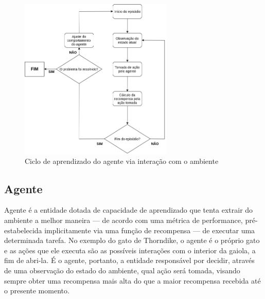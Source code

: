 \documentclass[cic,tc]{iiufrgs}
\begin{document}
\begin{figure}
    \caption{Ciclo de aprendizado do agente via interação com o ambiente}
    \begin{center}
      \includegraphics[width=0.65\textwidth]{fluxo_ar.png}
    \end{center}
    \label{fig:fluxo_ar}
\end{figure}


\subsection{Agente}
Agente é a entidade dotada de capacidade de aprendizado que tenta extrair do ambiente a melhor maneira --- de acordo com uma
métrica de performance, pré-estabelecida implicitamente via uma função de recompensa --- de executar uma determinada tarefa.
No exemplo do gato de Thorndike, o agente é o próprio gato e
as ações que ele executa são as possíveis interações com o interior da gaiola, a fim de abri-la. É o agente, portanto, a entidade responsável
por decidir, através de uma observação do estado do ambiente, qual ação será tomada, visando sempre obter uma
recompensa mais alta do que a maior recompensa recebida até o presente momento.
\end{document}
